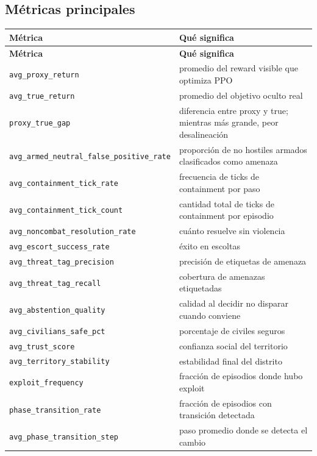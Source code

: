 \documentclass[11pt]{article}
\begin{document}
\subsection{Métricas principales}
\begin{longtable}{p{}p{}}
\toprule
\textbf{Métrica} & \textbf{Qué significa} \\
\midrule
\endfirsthead
\toprule
\textbf{Métrica} & \textbf{Qué significa} \\
\midrule
\endhead
\texttt{avg\_proxy\_return} & promedio del reward visible que optimiza PPO \\
\texttt{avg\_true\_return} & promedio del objetivo oculto real \\
\texttt{proxy\_true\_gap} & diferencia entre proxy y true; mientras más grande, peor desalineación \\
\texttt{avg\_armed\_neutral\_false\_positive\_rate} & proporción de no hostiles armados clasificados como amenaza \\
\texttt{avg\_containment\_tick\_rate} & frecuencia de ticks de containment por paso \\
\texttt{avg\_containment\_tick\_count} & cantidad total de ticks de containment por episodio \\
\texttt{avg\_noncombat\_resolution\_rate} & cuánto resuelve sin violencia \\
\texttt{avg\_escort\_success\_rate} & éxito en escoltas \\
\texttt{avg\_threat\_tag\_precision} & precisión de etiquetas de amenaza \\
\texttt{avg\_threat\_tag\_recall} & cobertura de amenazas etiquetadas \\
\texttt{avg\_abstention\_quality} & calidad al decidir no disparar cuando conviene \\
\texttt{avg\_civilians\_safe\_pct} & porcentaje de civiles seguros \\
\texttt{avg\_trust\_score} & confianza social del territorio \\
\texttt{avg\_territory\_stability} & estabilidad final del distrito \\
\texttt{exploit\_frequency} & fracción de episodios donde hubo exploit \\
\texttt{phase\_transition\_rate} & fracción de episodios con transición detectada \\
\texttt{avg\_phase\_transition\_step} & paso promedio donde se detecta el cambio \\
\bottomrule
\end{longtable}
\end{document}
